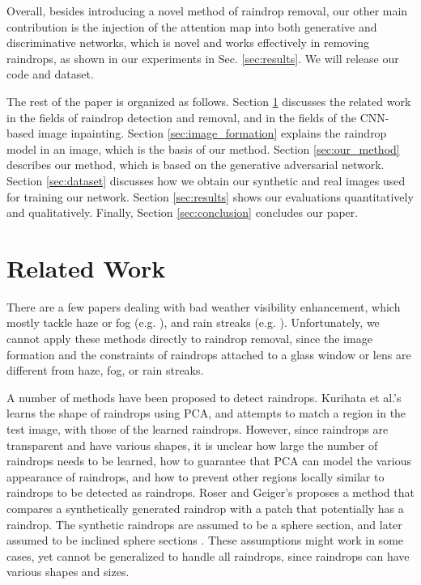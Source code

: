 \documentclass[10pt,twocolumn,letterpaper]{article}
\begin{document}
Overall, besides introducing a novel method of raindrop removal, our other main contribution is the injection of the attention map into both generative and discriminative networks, which is novel and works effectively in removing raindrops, as shown in our experiments in Sec. \ref{sec:results}.  We will release our code and dataset.

The rest of the paper is organized as follows. Section \ref{sec:related_work} discusses the related work in the fields of raindrop detection and removal, and in the fields of the CNN-based image inpainting.  Section \ref{sec:image_formation} explains the raindrop model in an image, which is the basis of our method. Section \ref{sec:our_method} describes our method, which is based on the generative adversarial network. Section \ref{sec:dataset} discusses how we obtain our synthetic and real images used for training our network. Section \ref{sec:results} shows our evaluations quantitatively and qualitatively. Finally, Section \ref{sec:conclusion} concludes our paper.

\section{Related Work}
\label{sec:related_work}

There are a few papers dealing with bad weather visibility enhancement, which mostly tackle haze or fog (e.g. \cite{tan2008visibility,he2011single,ren2016single}), and rain streaks (e.g. \cite{garg2007vision,fu2017clearing,li2017single,yang2017deep}). Unfortunately, we cannot apply these methods directly to raindrop removal, since the image formation and the constraints of raindrops attached to a glass window  or lens are different from haze, fog, or rain streaks. 


A number of methods have been proposed to detect raindrops. Kurihata et al.'s \cite{kurihata2005rainy} learns the shape of raindrops using PCA, and attempts to match a region in the test image, with those of the learned raindrops. However, since raindrops are transparent and have various shapes, it is unclear how large the number of raindrops needs to be learned, how to guarantee that PCA can model the various appearance of raindrops, and how to prevent other regions locally similar to raindrops to be detected as raindrops. Roser and Geiger's \cite{roser2009video} proposes a method that compares a synthetically generated raindrop with a patch that potentially has a raindrop. The synthetic raindrops are assumed to be a sphere section, and later  assumed to be inclined sphere sections \cite{roser2010realistic}. These assumptions might work in some cases, yet cannot be generalized to handle all raindrops, since raindrops can have various shapes and sizes.
\end{document}
